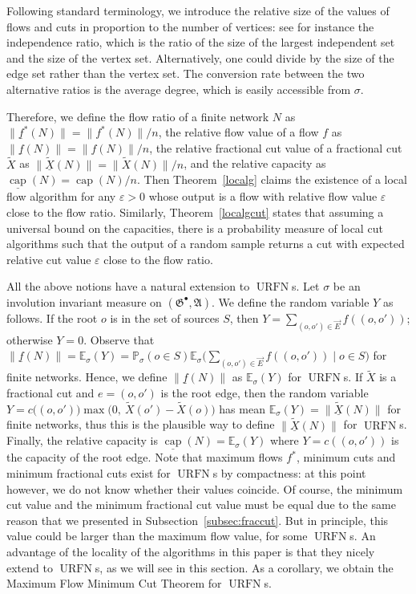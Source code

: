 \documentclass[12pt,a4paper]{article}
\newcommand{\capp}{\operatorname{cap}}
\newcommand{\eps}{\varepsilon}
\newcommand{\vE}{\vec{E}}
\renewcommand{\:}{\colon}
\DeclareMathOperator{\URN}{URFN}
\begin{document}
Following standard terminology, we introduce the relative size of the values of flows and cuts in proportion to the number of vertices: see for instance the independence ratio, which is the ratio of the size of the largest independent set and the size of the vertex set. 
Alternatively, one could divide by the size of the edge set rather than the vertex set. 
The conversion rate between the two alternative ratios is the average degree, which is easily accessible from $\sigma$. 


Therefore, we define the flow ratio of a finite network $N$ as $\big\|\underline{f}^*(N)\big\| = \big\|f^*(N)\big\|/n$, the relative flow value of a flow $f$ as $\big\|\underline{f}(N)\big\| =\big\| f(N) \big\|/n$, the relative fractional cut value of a fractional cut $\tilde{X}$ as $\big\|\underline{\tilde{X}}(N)\big\| =\big\| \tilde{X}(N) \big\|/n$, and the relative capacity as $\underline{\capp}(N) = \capp(N)/n$. 
Then Theorem~\ref{localg} claims the existence of a local flow algorithm for any $\eps>0$ whose output is a flow with relative flow value $\eps$ close to the flow ratio. 
Similarly, Theorem~\ref{localgcut} states that assuming a universal bound on the capacities, there is a probability measure of local cut algorithms such that the output of a random sample returns a cut with expected relative cut value $\eps$ close to the flow ratio. 

All the above notions have a natural extension to $\URN$s. 
Let $\sigma$ be an involution invariant measure on $(\mathfrak{G}^\bullet, \mathfrak{A})$. 
We define the random variable $Y$ as follows. 
If the root $o$ is in the set of sources $S$, then $Y=\sum\limits_{(o,o')\in\vE} f((o,o'))$; otherwise $Y=0$. 
Observe that $\big\|\underline{f}(N)\big\| = \mathbb{E}_\sigma (Y) = \mathbb{P}_\sigma(o\in S)\mathbb{E}_\sigma \bigg(\sum\limits_{(o,o')\in\vE} f((o,o')) \mid o\in S\bigg)$ for finite networks. 
Hence, we define $\big\|\underline{f}(N)\big\|$ as $\mathbb{E}_\sigma (Y)$ for $\URN$s. 
If $\tilde{X}$ is a fractional cut and $e=(o,o')$ is the root edge, then the random variable $Y=c\big((o, o')\big) \max\big(0,\ \tilde{X}(o') - \tilde{X}(o)\big)$ has mean $\mathbb{E}_\sigma (Y) = \big\|\underline{\tilde{X}}(N)\big\|$ for finite networks, thus this is the plausible way to define $\big\|\underline{\tilde{X}}(N)\big\|$ for $\URN$s. 
Finally, the relative capacity is $\underline{\capp}(N) = \mathbb{E}_\sigma (Y)$ where $Y=c((o,o'))$ is the capacity of the root edge. 
Note that maximum flows $f^*$, minimum cuts and minimum fractional cuts exist for $\URN$s by compactness: at this point however, we do not know whether their values coincide. 
Of course, the minimum cut value and the minimum fractional cut value must be equal due to the same reason that we presented in Subsection~\ref{subsec:fraccut}. 
But in principle, this value could be larger than the maximum flow value, for some $\URN$s. 
An advantage of the locality of the algorithms in this paper is that they nicely extend to $\URN$s, as we will see in this section. 
As a corollary, we obtain the Maximum Flow Minimum Cut Theorem for $\URN$s. 
\end{document}
